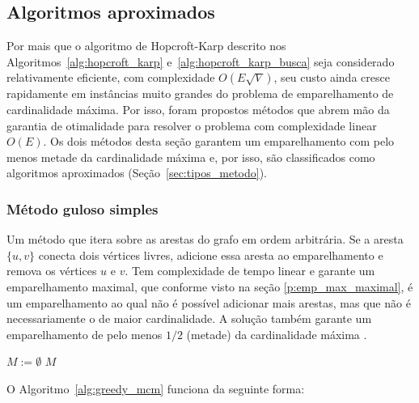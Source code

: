 \subsection{Algoritmos aproximados}
\label{sec:h_emp_card_max_bip}

Por mais que o algoritmo de Hopcroft-Karp descrito nos Algoritmos~\ref{alg:hopcroft_karp} e~\ref{alg:hopcroft_karp_busca} seja considerado relativamente eficiente, com complexidade $O(E \sqrt{V})$, seu custo ainda cresce rapidamente em instâncias muito grandes do problema de emparelhamento de cardinalidade máxima. Por isso, foram propostos métodos que abrem mão da garantia de otimalidade para resolver o problema com complexidade linear $O(E)$. Os dois métodos desta seção garantem um emparelhamento com pelo menos metade da cardinalidade máxima e, por isso, são classificados como algoritmos aproximados (Seção~\ref{sec:tipos_metodo}).

\subsubsection{Método guloso simples}
\label{p:h_gulosa_simples}

Um método que itera sobre as arestas do grafo em ordem arbitrária. Se a aresta $\{u,v\}$ conecta dois vértices livres, adicione essa aresta ao emparelhamento e remova os vértices $u$ e $v$. Tem complexidade de tempo linear e garante um emparelhamento maximal, que conforme visto na seção \ref{p:emp_max_maximal}, é um emparelhamento ao qual não é possível adicionar mais arestas, mas que não é necessariamente o de maior cardinalidade. A solução também garante um emparelhamento de pelo menos $1/2$ (metade) da cardinalidade máxima \cite{vazirani2001}.

\begin{algorithm}[H]
    \DontPrintSemicolon
    \SetAlgoLined

    \caption{Método guloso simples \cite{vazirani2001}}
    \label{alg:greedy_mcm}

    $M := \emptyset$\label{gs:init}\;
    \KwRet $M$\label{gs:ret}\;
\end{algorithm}

O Algoritmo~\ref{alg:greedy_mcm} funciona da seguinte forma:


